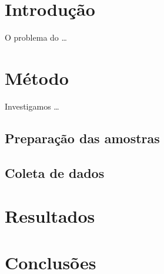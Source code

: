 \documentclass{article}
\begin{document}
\section{Introdução}

O problema do \ldots

\section{Método}

Investigamos \ldots

\subsection{Preparação das amostras}

\subsection{Coleta de dados}

\section{Resultados}

\section{Conclusões}
\end{document}
